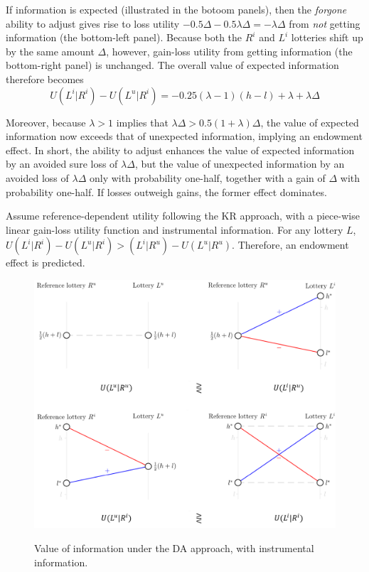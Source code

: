 If information is expected (illustrated in the botoom panels), then the \emph{forgone} ability to adjust gives rise to loss utility $-0.5\Delta - 0.5 \lambda \Delta = -\lambda \Delta$ from \emph{not} getting information (the bottom-left panel). Because both the $R^i$ and $L^i$ lotteries shift up by the same amount $\Delta$, however, gain-loss utility from getting information (the bottom-right panel) is unchanged. The overall value of expected information therefore becomes
\begin{equation*}
  U(L^i|R^i)-U(L^u|R^i)=-0.25(\lambda-1)(h-l)+\lambda +\lambda \Delta
\end{equation*}

Moreover, because $\lambda>1$ implies that $\lambda \Delta > 0.5(1+\lambda)\Delta$, the value of expected information now exceeds that of unexpected information, implying an endowment effect. In short, the ability to adjust enhances the value of expected information by an avoided sure loss of $\lambda \Delta$, but the value of unexpected information by an avoided loss of $\lambda \Delta$ only with probability one-half, together with a gain of $\Delta$ with probability one-half. If losses outweigh gains, the former effect dominates.

\FloatBarrier

\begin{prop}
  Assume reference-dependent utility following the KR approach, with a piece-wise linear gain-loss utility function and instrumental information. For any lottery $L$, $U(L^i|R^i)-U(L^u|R^i)>(L^i|R^u)-U(L^u|R^u)$. Therefore, an endowment effect is predicted.
  \label{prop:instrumental-KR}
\end{prop}

\begin{figure}[ht]
  \caption{Value of information under the DA approach, with instrumental information.}\label{fig:instrumental-KR}
  \begin{center}
  {\includegraphics[width=1\textwidth]{./figures/theory_fig4.png}}
  \end{center}
\end{figure}

